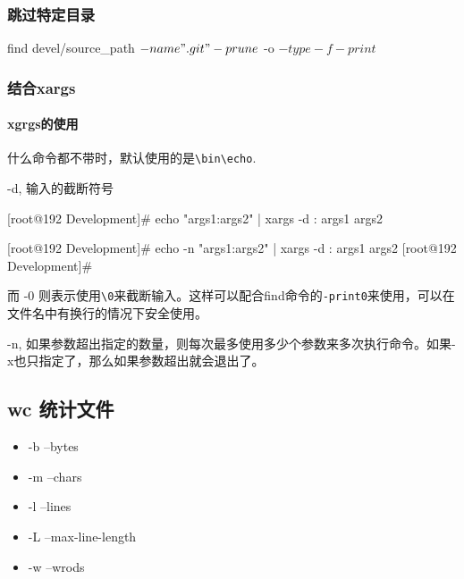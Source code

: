 \subsubsection{跳过特定目录}

\begin{Bash}[]

find devel/source_path \( -name ".git" -prune \) -o \( -type -f -print \)

\end{Bash}

\subsubsection{结合xargs}

\paragraph{xgrgs的使用}

什么命令都不带时，默认使用的是\lstinline$\bin\echo$.

-d, 输入的截断符号

\begin{Bash}

[root@192 Development]# echo "args1:args2" | xargs -d :
args1 args2

[root@192 Development]# echo -n "args1:args2" | xargs -d :
args1 args2
[root@192 Development]# 

\end{Bash}

而 -0 则表示使用\lstinline$\0$来截断输入。这样可以配合find命令的\lstinline$-print0$来使用，可以在文件名中有换行的情况下安全使用。


-n, 如果参数超出指定的数量，则每次最多使用多少个参数来多次执行命令。如果-x也只指定了，那么如果参数超出就会退出了。



\subsection{wc 统计文件}

\begin{itemize}
\item -b --bytes
\item -m --chars
\item -l --lines
\item -L --max-line-length
\item -w --wrods
\end{itemize}

